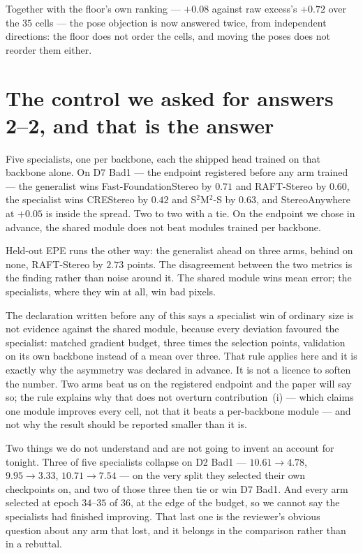 \documentclass[11pt,a4paper]{article}
\begin{document}
Together with the floor's own ranking --- $+0.08$ against raw excess's $+0.72$
over the $35$ cells --- the pose objection is now answered twice, from
independent directions: the floor does not order the cells, and moving the
poses does not reorder them either.



\section*{The control we asked for answers 2--2, and that is the answer}

Five specialists, one per backbone, each the shipped head trained on that
backbone alone. On D7 Bad1 --- the endpoint registered before any arm
trained --- the generalist wins Fast-FoundationStereo by $0.71$ and RAFT-Stereo
by $0.60$, the specialist wins CREStereo by $0.42$ and S$^2$M$^2$-S by $0.63$,
and StereoAnywhere at $+0.05$ is inside the spread. Two to two with a tie. On
the endpoint we chose in advance, the shared module does not beat modules
trained per backbone.

Held-out EPE runs the other way: the generalist ahead on three arms, behind on
none, RAFT-Stereo by $2.73$ points. The disagreement between the two metrics is
the finding rather than noise around it. The shared module wins mean error; the
specialists, where they win at all, win bad pixels.

The declaration written before any of this says a specialist win of ordinary
size is not evidence against the shared module, because every deviation
favoured the specialist: matched gradient budget, three times the selection
points, validation on its own backbone instead of a mean over three. That rule
applies here and it is exactly why the asymmetry was declared in advance. It is
not a licence to soften the number. Two arms beat us on the registered endpoint
and the paper will say so; the rule explains why that does not overturn
contribution~(i) --- which claims one module improves every cell, not that it
beats a per-backbone module --- and not why the result should be reported
smaller than it is.

Two things we do not understand and are not going to invent an account for
tonight. Three of five specialists collapse on D2 Bad1 --- $10.61\to4.78$,
$9.95\to3.33$, $10.71\to7.54$ --- on the very split they selected their own
checkpoints on, and two of those three then tie or win D7 Bad1. And every arm
selected at epoch $34$--$35$ of $36$, at the edge of the budget, so we cannot
say the specialists had finished improving. That last one is the reviewer's
obvious question about any arm that lost, and it belongs in the comparison
rather than in a rebuttal.
\end{document}
